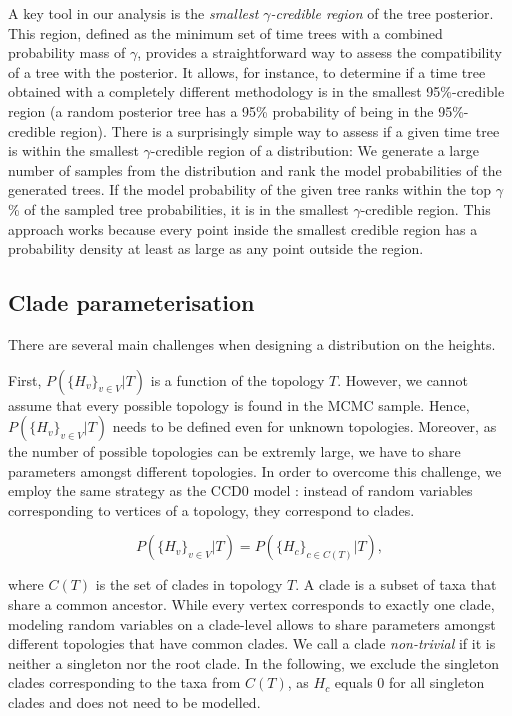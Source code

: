 \documentclass[10pt,letterpaper]{article}
\newcommand{\Pro}[1]{P\left(#1\right)}
\begin{document}
A key tool in our analysis is the \emph{smallest $\gamma$-credible region} of the tree posterior. This region, defined as the minimum set of time trees with a combined probability mass of $\gamma$, provides a straightforward way to assess the compatibility of a tree with the posterior. It allows, for instance, to determine if a time tree obtained with a completely different methodology is in the smallest 95\%-credible region (a random posterior tree has a 95\% probability of being in the 95\%-credible region). There is a surprisingly simple way to assess if a given time tree is within the smallest $\gamma$-credible region of a distribution: We generate a large number of samples from the distribution and rank the model probabilities of the generated trees. If the model probability of the given tree ranks within the top $\gamma$\% of the sampled tree probabilities, it is in the smallest $\gamma$-credible region. This approach works because every point inside the smallest credible region has a probability density at least as large as any point outside the region.

\subsection*{Clade parameterisation}

There are several main challenges when designing a distribution on the heights.

First, $P\left(\{H_v\}_{v \in V} | T\right)$ is a function of the topology $T$. However, we cannot assume that every possible topology is found in the MCMC sample. Hence, $P\left(\{H_v\}_{v \in V} | T\right)$ needs to be defined even for unknown topologies. Moreover, as the number of possible topologies can be extremly large, we have to share parameters amongst different topologies. In order to overcome this challenge, we employ the same strategy as the CCD0 model \cite{ccd}: instead of random variables corresponding to vertices of a topology, they correspond to clades.

$$
\Pro{\{H_v\}_{v \in V} | T} = \Pro{\{H_c\}_{c \in C(T)} | T},
$$

where $C(T)$ is the set of clades in topology $T$. A clade is a subset of taxa that share a common ancestor. While every vertex corresponds to exactly one clade, modeling random variables on a clade-level allows to share parameters amongst different topologies that have common clades. We call a clade \emph{non-trivial} if it is neither a singleton nor the root clade. In the following, we exclude the singleton clades corresponding to the taxa from $C(T)$, as $H_c$ equals $0$ for all singleton clades and does not need to be modelled. 
\end{document}

